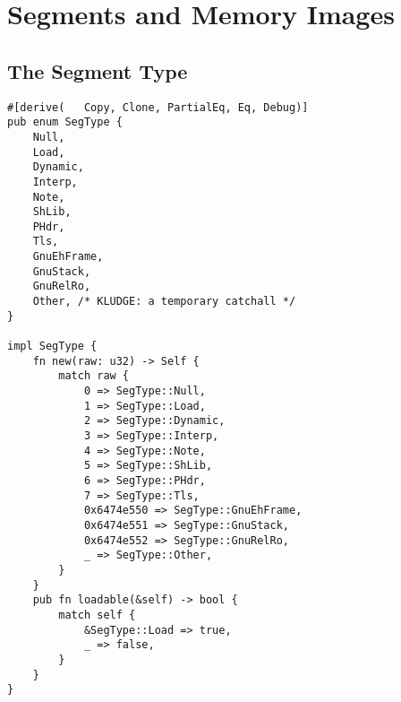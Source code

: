 \documentclass[11pt]{article}
\begin{document}
\section{Segments and Memory Images}
\label{sec:orge6975e9}

\subsection{The Segment Type}
\label{sec:org0afc910}

\lstset{language=rust,label=org218ec3d,caption= ,captionpos=b,numbers=none}
\begin{lstlisting}
#[derive(   Copy, Clone, PartialEq, Eq, Debug)]
pub enum SegType {
    Null,
    Load,
    Dynamic,
    Interp,
    Note,
    ShLib,
    PHdr,
    Tls,
    GnuEhFrame,
    GnuStack,
    GnuRelRo,
    Other, /* KLUDGE: a temporary catchall */
}

impl SegType {
    fn new(raw: u32) -> Self {
        match raw {
            0 => SegType::Null,
            1 => SegType::Load,
            2 => SegType::Dynamic,
            3 => SegType::Interp,
            4 => SegType::Note,
            5 => SegType::ShLib,
            6 => SegType::PHdr,
            7 => SegType::Tls,
            0x6474e550 => SegType::GnuEhFrame,
            0x6474e551 => SegType::GnuStack,
            0x6474e552 => SegType::GnuRelRo,
            _ => SegType::Other,
        }
    }
    pub fn loadable(&self) -> bool {
        match self {
            &SegType::Load => true,
            _ => false,
        }
    }
}
\end{lstlisting}
\end{document}
